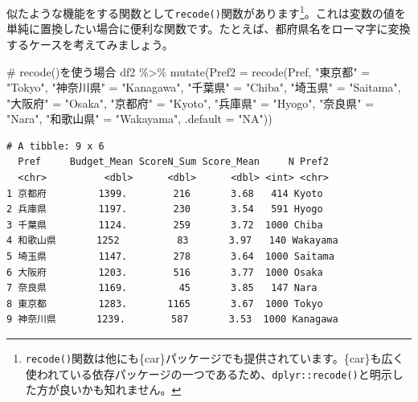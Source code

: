 \documentclass[
  a4paper,
  pandoc,
  ja=standard,
  jafont=haranoaji]{bxjsbook}
\newenvironment{Shaded}{\begin{snugshade}}{\end{snugshade}}
\newcommand{\AttributeTok}[1]{\textcolor[rgb]{0.00,0.48,0.65}{#1}}
\newcommand{\CommentTok}[1]{\textcolor[rgb]{0.37,0.37,0.37}{#1}}
\newcommand{\FunctionTok}[1]{\textcolor[rgb]{0.28,0.35,0.67}{#1}}
\newcommand{\NormalTok}[1]{\textcolor[rgb]{0.00,0.48,0.65}{#1}}
\newcommand{\OtherTok}[1]{\textcolor[rgb]{0.00,0.48,0.65}{#1}}
\newcommand{\SpecialCharTok}[1]{\textcolor[rgb]{0.37,0.37,0.37}{#1}}
\newcommand{\StringTok}[1]{\textcolor[rgb]{0.13,0.47,0.30}{#1}}
\begin{document}
似たような機能をする関数として\texttt{recode()}関数があります\footnote{\texttt{recode()}関数は他にも\{car\}パッケージでも提供されています。\{car\}も広く使われている依存パッケージの一つであるため、\texttt{dplyr::recode()}と明示した方が良いかも知れません。}。これは変数の値を単純に置換したい場合に便利な関数です。たとえば、都府県名をローマ字に変換するケースを考えてみましょう。

\begin{Shaded}
\begin{Highlighting}[numbers=left,,]
\CommentTok{\# recode()を使う場合}
\NormalTok{df2 }\SpecialCharTok{\%\textgreater{}\%} 
  \FunctionTok{mutate}\NormalTok{(}\AttributeTok{Pref2 =} \FunctionTok{recode}\NormalTok{(Pref,}
                        \StringTok{"東京都"}   \OtherTok{=} \StringTok{"Tokyo"}\NormalTok{,}
                        \StringTok{"神奈川県"} \OtherTok{=} \StringTok{"Kanagawa"}\NormalTok{,}
                        \StringTok{"千葉県"}   \OtherTok{=} \StringTok{"Chiba"}\NormalTok{,}
                        \StringTok{"埼玉県"}   \OtherTok{=} \StringTok{"Saitama"}\NormalTok{,}
                        \StringTok{"大阪府"}   \OtherTok{=} \StringTok{"Osaka"}\NormalTok{,}
                        \StringTok{"京都府"}   \OtherTok{=} \StringTok{"Kyoto"}\NormalTok{,}
                        \StringTok{"兵庫県"}   \OtherTok{=} \StringTok{"Hyogo"}\NormalTok{,}
                        \StringTok{"奈良県"}   \OtherTok{=} \StringTok{"Nara"}\NormalTok{,}
                        \StringTok{"和歌山県"} \OtherTok{=} \StringTok{"Wakayama"}\NormalTok{,}
                        \AttributeTok{.default  =} \StringTok{"NA"}\NormalTok{))}
\end{Highlighting}
\end{Shaded}

\begin{verbatim}
# A tibble: 9 x 6
  Pref     Budget_Mean ScoreN_Sum Score_Mean     N Pref2   
  <chr>          <dbl>      <dbl>      <dbl> <int> <chr>   
1 京都府         1399.        216       3.68   414 Kyoto   
2 兵庫県         1197.        230       3.54   591 Hyogo   
3 千葉県         1124.        259       3.72  1000 Chiba   
4 和歌山県       1252          83       3.97   140 Wakayama
5 埼玉県         1147.        278       3.64  1000 Saitama 
6 大阪府         1203.        516       3.77  1000 Osaka   
7 奈良県         1169.         45       3.85   147 Nara    
8 東京都         1283.       1165       3.67  1000 Tokyo   
9 神奈川県       1239.        587       3.53  1000 Kanagawa
\end{verbatim}
\end{document}
